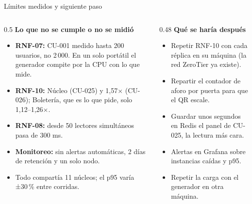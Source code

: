 \begin{frame}{Límites medidos y siguiente paso}
\footnotesize
\begin{columns}[T]
\begin{column}{0.5\textwidth}
\textbf{Lo que no se cumple o no se midió}
\begin{itemize}\setlength\itemsep{0.2em}
\item \textbf{RNF-07:} CU-001 medido hasta 200 usuarios, no 2\,000. En un solo portátil el generador
compite por la CPU con lo que mide.
\item \textbf{RNF-10:} Núcleo  (CU-025) y 1,57$\times$ (CU-026); Boletería, que es lo que
pide, solo 1,12--1,26$\times$.
\item \textbf{RNF-08:} desde 50 lectores simultáneos pasa de 300 ms.
\item \textbf{Monitoreo:} sin alertas automáticas, 2 días de retención y un solo nodo.
\item Todo compartía 11 núcleos; el p95 varía ±30\,\% entre corridas.
\end{itemize}
\end{column}
\begin{column}{0.48\textwidth}
\textbf{Qué se haría después}
\begin{itemize}\setlength\itemsep{0.2em}
\item Repetir RNF-10 con cada réplica en su máquina (la red ZeroTier ya existe).
\item Repartir el contador de aforo por puerta para que el QR escale.
\item Guardar unos segundos en Redis el panel de CU-025, la lectura más cara.
\item Alertas en Grafana sobre instancias caídas y p95.
\item Repetir la carga con el generador en otra máquina.
\end{itemize}
\end{column}
\end{columns}
\end{frame}
